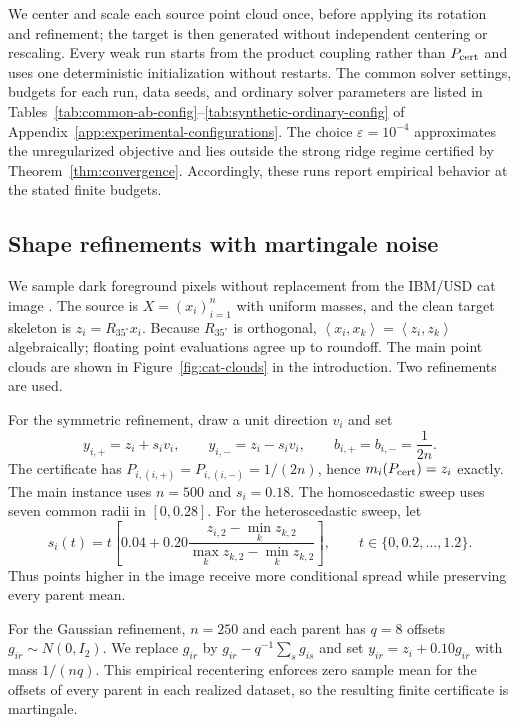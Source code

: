\documentclass[11pt]{article}
\newcommand{\ip}[2]{\left\langle #1,#2\right\rangle}
\theoremstyle{plain}
\theoremstyle{definition}
\theoremstyle{remark}
\begin{document}
We center and scale each source point cloud once, before applying its rotation
and refinement; the target is then generated without independent centering or rescaling.
Every weak run starts from the product coupling rather than $P_{\rm cert}$ and
uses one deterministic initialization without restarts. The common solver
settings, budgets for each run, data seeds, and ordinary solver parameters are listed in
Tables~\ref{tab:common-ab-config}--\ref{tab:synthetic-ordinary-config} of
Appendix~\ref{app:experimental-configurations}. The choice
$\varepsilon=10^{-4}$ approximates the unregularized objective
and lies outside the strong ridge regime certified by
Theorem~\ref{thm:convergence}. Accordingly, these runs report empirical
behavior at the stated finite budgets.

\subsection{Shape refinements with martingale noise}\label{subsec:shape-refinement}

We sample dark foreground pixels without replacement from the IBM/USD cat image
\cite{IBMUSD}. The source is $X=(x_i)_{i=1}^n$ with uniform masses, and the clean
target skeleton is $z_i=R_{35^\circ}x_i$. Because $R_{35^\circ}$ is orthogonal,
$\ip{x_i}{x_k}=\ip{z_i}{z_k}$ algebraically;
floating point evaluations agree up to roundoff. The main point clouds are
shown in Figure~\ref{fig:cat-clouds} in the introduction. Two refinements are used.

For the symmetric refinement, draw a unit direction $v_i$ and set
\[
y_{i,+}=z_i+s_i v_i,\qquad y_{i,-}=z_i-s_i v_i,\qquad
 b_{i,+}=b_{i,-}=\frac{1}{2n}.
\]
The certificate has $P_{i,(i,+)}=P_{i,(i,-)}=1/(2n)$, hence
$m_i(P_{\rm cert})=z_i$ exactly. The main instance uses $n=500$ and $s_i=0.18$.
The homoscedastic sweep uses seven common radii in $[0,0.28]$. For the
heteroscedastic sweep, let
\[
 s_i(t)=t\left[0.04+0.20
 \frac{z_{i,2}-\min_k z_{k,2}}{\max_kz_{k,2}-\min_kz_{k,2}}\right],
 \qquad t\in\{0,0.2,\ldots,1.2\}.
\]
Thus points higher in the image receive more conditional spread while preserving
every parent mean.

For the Gaussian refinement, $n=250$ and each parent has $q=8$ offsets
$g_{ir}\sim N(0,I_2)$. We replace $g_{ir}$ by
$g_{ir}-q^{-1}\sum_sg_{is}$ and set $y_{ir}=z_i+0.10g_{ir}$ with mass $1/(nq)$.
This empirical recentering enforces zero sample mean for the offsets of every parent
in each realized dataset, so the resulting finite certificate is martingale.
\end{document}
